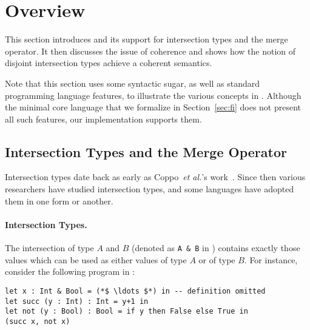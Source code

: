 \section{Overview} \label{sec:overview}

This section introduces \name and its support for intersection types and the
merge operator. It then discusses the issue of coherence and shows how the
notion of disjoint intersection types achieve a coherent semantics.

Note that this section uses some syntactic sugar, as well as standard
programming language features, to illustrate the various concepts in
\name. Although the minimal core language that we formalize in
Section~\ref{sec:fi} does not present all such features, our implementation
supports them.

\subsection{Intersection Types and the Merge Operator}

Intersection types date back as early as Coppo~\textit{et
al.}'s work~\cite{coppo1981functional}. Since then various researchers have
studied intersection types, and some languages have adopted them in one
form or another.

\paragraph{Intersection Types.}
The intersection of type $A$ and $B$ (denoted as \lstinline{A & B} in
\name) contains exactly those values
which can be used as either values of type $A$ or of type $B$. For instance,
consider the following program in \name:

\begin{lstlisting}
let x : Int & Bool = (*$ \ldots $*) in -- definition omitted
let succ (y : Int) : Int = y+1 in
let not (y : Bool) : Bool = if y then False else True in
(succ x, not x)
\end{lstlisting}

